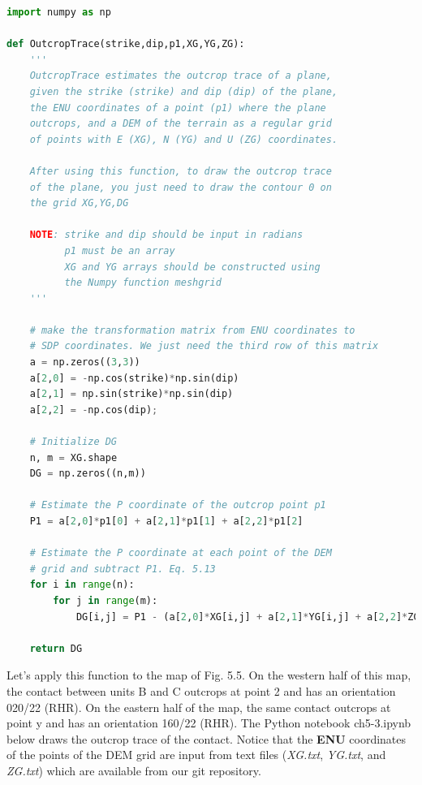 \documentclass[a4paper , 12pt]{book}
\begin{document}
\begin{lstlisting}[language=Python, frame=single]
import numpy as np

def OutcropTrace(strike,dip,p1,XG,YG,ZG):
    '''
    OutcropTrace estimates the outcrop trace of a plane,
    given the strike (strike) and dip (dip) of the plane,
    the ENU coordinates of a point (p1) where the plane
    outcrops, and a DEM of the terrain as a regular grid
    of points with E (XG), N (YG) and U (ZG) coordinates.
    
    After using this function, to draw the outcrop trace 
    of the plane, you just need to draw the contour 0 on 
    the grid XG,YG,DG
    
    NOTE: strike and dip should be input in radians
          p1 must be an array
          XG and YG arrays should be constructed using 
          the Numpy function meshgrid
    '''
    
    # make the transformation matrix from ENU coordinates to 
    # SDP coordinates. We just need the third row of this matrix
    a = np.zeros((3,3))
    a[2,0] = -np.cos(strike)*np.sin(dip) 
    a[2,1] = np.sin(strike)*np.sin(dip) 
    a[2,2] = -np.cos(dip);
    
    # Initialize DG
    n, m = XG.shape
    DG = np.zeros((n,m))
    
    # Estimate the P coordinate of the outcrop point p1
    P1 = a[2,0]*p1[0] + a[2,1]*p1[1] + a[2,2]*p1[2]
    
    # Estimate the P coordinate at each point of the DEM
    # grid and subtract P1. Eq. 5.13
    for i in range(n):
        for j in range(m):
            DG[i,j] = P1 - (a[2,0]*XG[i,j] + a[2,1]*YG[i,j] + a[2,2]*ZG[i,j])
    
    return DG  
\end{lstlisting}

Let's apply this function to the map of Fig. 5.5. On the western half of this map, the contact between units B and C outcrops at point 2 and has an orientation 020/22 (RHR). On the eastern half of the map, the same contact outcrops at point y and has an orientation 160/22 (RHR). The Python notebook ch5-3.ipynb below draws the outcrop trace of the contact. Notice that the \textbf{ENU} coordinates of the points of the DEM grid are input from text files (\textit{XG.txt}, \textit{YG.txt}, and \textit{ZG.txt}) which are available from our git repository.
\end{document}
